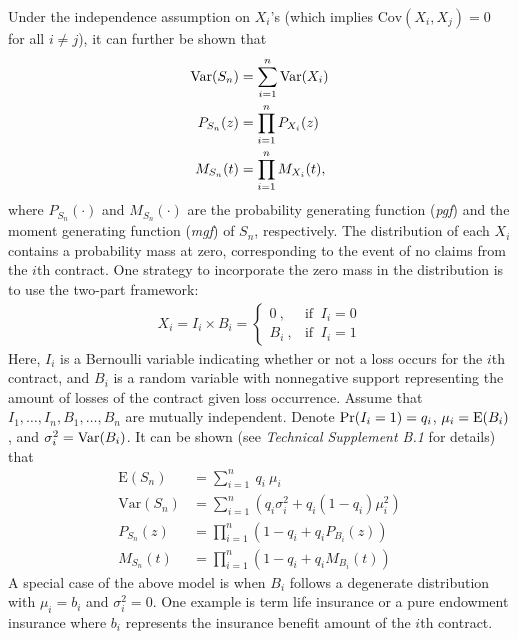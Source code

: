 \documentclass[]{book}
\theoremstyle{definition}
\theoremstyle{definition}
\theoremstyle{definition}
\theoremstyle{remark}
\begin{document}
Under the independence assumption on \(X_i\)'s (which implies
\(\mathrm{Cov}\left( X_i, X_j \right) = 0\) for all \(i \neq j\)), it
can further be shown that \[\begin{aligned}
    {\rm Var}(S_n) &= \sum_{i=1}^{n} {\rm Var}(X_i) \\
    P_{S_n}(z) &= \prod_{i=1}^{n}P_{X_i}(z) \\
    M_{S_n}(t) &= \prod_{i=1}^{n}M_{X_i}(t), 
 \end{aligned}\] where \(P_{S_n}(\cdot)\) and \(M_{S_n}(\cdot)\) are the
probability generating function (\emph{pgf}) and the moment generating
function (\emph{mgf}) of \(S_n\), respectively. The distribution of each
\(X_i\) contains a probability mass at zero, corresponding to the event
of no claims from the \(i\)th contract. One strategy to incorporate the
zero mass in the distribution is to use the two-part framework:
\[\begin{aligned}
X_i = I_i\times B_i = \left\{\begin{array}{ll}
                               0~, & \text{if }~ I_i=0 \\
                               B_i~, & \text{if }~ I_i=1
                             \end{array}
             \right.
\end{aligned}\] Here, \(I_i\) is a Bernoulli variable indicating whether
or not a loss occurs for the \(i\)th contract, and \(B_i\) is a random
variable with nonnegative support representing the amount of losses of
the contract given loss occurrence. Assume that
\(I_1 ,\ldots,I_n ,B_1 ,\ldots,B_n\) are mutually independent. Denote
\({\rm Pr} (I_i =1)=q_i\), \(\mu_i={\rm E}(B_i)\), and
\(\sigma_i^2={\rm Var}(B_i)\). It can be shown (see \emph{Technical
Supplement B.1} for details) that \[\begin{aligned}
\mathrm{E}(S_n)& =\sum_{i=1}^n ~q_i  ~\mu _i \\
\mathrm{Var}(S_n) & =\sum_{i=1}^n \left( q_i \sigma _i^2+q_i (1-q_i)\mu_i^2 \right)\\
P_{S_n}(z) & =\prod_{i=1}^n \left( 1-q_i+q_i P_{B_i}(z) \right)\\
M_{S_n}(t) & =\prod_{i=1}^n \left( 1-q_i+q_i M_{B_i}(t) \right)
\end{aligned}\] A special case of the above model is when \(B_i\)
follows a degenerate distribution with \(\mu_i=b_i\) and
\(\sigma^2_i=0\). One example is term life insurance or a pure endowment
insurance where \(b_i\) represents the insurance benefit amount of the
\(i\)th contract.
\end{document}
